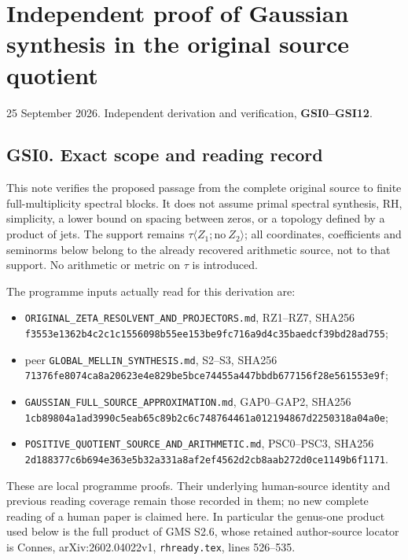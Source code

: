 \section{Independent proof of Gaussian synthesis in the original source
quotient}\label{independent-proof-of-gaussian-synthesis-in-the-original-source-quotient}

25 September 2026. Independent derivation and verification,
\textbf{GSI0--GSI12}.

\subsection{GSI0. Exact scope and reading
record}\label{gsi0.-exact-scope-and-reading-record}

This note verifies the proposed passage from the complete original
source to finite full-multiplicity spectral blocks. It does not assume
primal spectral synthesis, RH, simplicity, a lower bound on spacing
between zeros, or a topology defined by a product of jets. The support
remains \(\tau\langle Z_1;\mathrm{no}\ Z_2\rangle\); all coordinates,
coefficients and seminorms below belong to the already recovered
arithmetic source, not to that support. No arithmetic or metric on
\(\tau\) is introduced.

The programme inputs actually read for this derivation are:

\begin{itemize}
\tightlist
\item
  \nolinkurl{ORIGINAL_ZETA_RESOLVENT_AND_PROJECTORS.md}, RZ1--RZ7,
  SHA256
  \nolinkurl{f3553e1362b4c2c1c1556098b55ee153be9fc716a9d4c35baedcf39bd28ad755};
\item
  peer \texttt{GLOBAL\_MELLIN\_SYNTHESIS.md}, S2--S3, SHA256
  \nolinkurl{71376fe8074ca8a20623e4e829be5bce74455a447bbdb677156f28e561553e9f};
\item
  \nolinkurl{GAUSSIAN_FULL_SOURCE_APPROXIMATION.md}, GAP0--GAP2, SHA256
  \nolinkurl{1cb89804a1ad3990c5eab65c89b2c6c748764461a012194867d2250318a04a0e};
\item
  \nolinkurl{POSITIVE_QUOTIENT_SOURCE_AND_ARITHMETIC.md}, PSC0--PSC3,
  SHA256
  \nolinkurl{2d188377c6b694e363e5b32a331a8af2ef4562d2cb8aab272d0ce1149b6f1171}.
\end{itemize}

These are local programme proofs. Their underlying human-source identity
and previous reading coverage remain those recorded in them; no new
complete reading of a human paper is claimed here. In particular the
genus-one product used below is the full product of GMS S2.6, whose
retained author-source locator is Connes, arXiv:2602.04022v1,
\texttt{rhready.tex}, lines 526--535.

